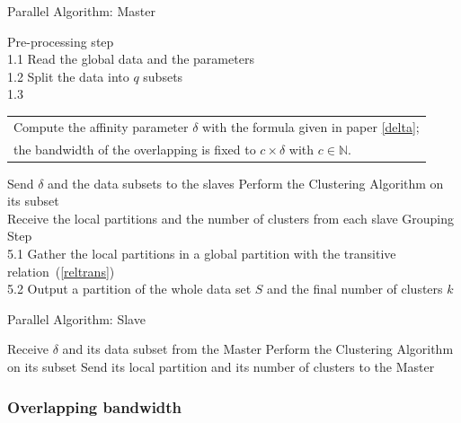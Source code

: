 \documentclass{llncs}
\begin{document}
\begin{algorithm}
\caption{Parallel Algorithm: Master}
\label{algo-master}
\begin{algorithmic}[1]
  \STATE Pre-processing step\\
        1.1 Read the global data and the parameters\\
        1.2 Split the data into $q$ subsets\\
        1.3 \begin{tabular}[t]{l}
            Compute the affinity parameter $\delta$ with the formula given 
            in paper \ref{delta}; \\
            the bandwidth of the overlapping is fixed to
            $c \times \delta$  with $c \in \mathbb{N}$.
            \end{tabular}
  \STATE Send $\delta$ and the data subsets to the slaves
  \STATE Perform the Clustering Algorithm on its subset\\
  \STATE Receive the local partitions and the number of clusters from each
         slave %
  \STATE Grouping Step\\
         5.1 Gather the local partitions in a global
         partition with the transitive relation~(\ref{reltrans})\\
         5.2 Output a partition of the whole data
         set $S$ and the final number of clusters $k$
\end{algorithmic}
\end{algorithm}

\vspace{-1.2cm}

\begin{algorithm}[!h]
\caption{Parallel Algorithm: Slave}
\label{algo-slave}
\begin{algorithmic}[1]
  \STATE Receive $\delta$  and its data subset from the Master
  \STATE Perform the Clustering Algorithm on its subset
  \STATE Send its local partition and its number of clusters to the Master
\end{algorithmic}
\end{algorithm}

\vspace{-1cm}

\subsubsection{Overlapping bandwidth}
\end{document}

